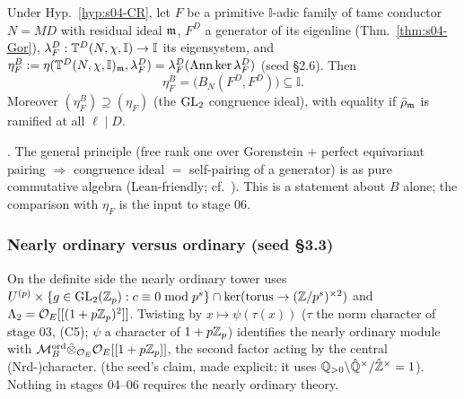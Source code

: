 \begin{theorem}\label{thm:s04-etaB}
Under Hyp.~\ref{hyp:s04-CR}, let $F$ be a primitive $\mathbb I$-adic family of tame conductor $N=MD$ with residual ideal $\mathfrak{m}$, $F^D$ a
generator of its eigenline (Thm.~\ref{thm:s04-Gor}), $\lambda^D_F:\mathbb{T}^D(N,\chi,\mathbb I)\to\mathbb I$ its eigensystem, and
$\eta^B_F:=\eta(\mathbb{T}^D(N,\chi,\mathbb I)_{\mathfrak{m}},\lambda^D_F)=\lambda^D_F(\operatorname{Ann}\ker\lambda^D_F)$ (seed \S2.6). Then
\[\eta^B_F=\big(B_N(F^D,F^D)\big)\subseteq\mathbb I .\]
Moreover $(\eta^B_F)\supseteq(\eta_F)$ (the $\mathrm{GL}_2$ congruence ideal), with equality if $\bar\rho_{\mathfrak{m}}$ is ramified at all $\ell\mid D$.
\end{theorem}
\noindent\stcited{} . The general principle (free rank one over Gorenstein
+ perfect equivariant pairing $\Rightarrow$ congruence ideal $=$ self-pairing of a generator) is \sttoprove{} as pure commutative
algebra (Lean-friendly; cf.\ ). This is a statement about $B$
alone; the comparison with $\eta_F$ is the input to stage 06.

\subsubsection{Nearly ordinary versus ordinary (seed \S3.3)}
\begin{remark}\label{rem:s04-nearly}
On the definite side the nearly ordinary tower uses $U^{(p)}\times\{g\in\mathrm{GL}_2(\mathbb{Z}_p):c\equiv0\bmod p^s\}\cap\ker(\text{torus}\to(\mathbb{Z}/p^s)^{\times2})$
and $\Lambda_2=\mathcal{O}_E[[(1+p\mathbb{Z}_p)^2]]$. Twisting by $x\mapsto\psi(\tau(x))$ ($\tau$ the norm character of stage 03, (C5); $\psi$ a character of
$1+p\mathbb{Z}_p$) identifies the nearly ordinary module with $\mathcal{M}^{\mathrm{ord}}_B\hat\otimes_{\mathcal{O}_E}\mathcal{O}_E[[1+p\mathbb{Z}_p]]$, the second factor acting by the central
(Nrd-)character. \stsketch{} (the seed's claim, made explicit; it uses $\mathbb{Q}_{>0}\backslash\hat{\mathbb{Q}}^\times/\hat{\mathbb{Z}}^\times=1$). Nothing in
stages 04--06 requires the nearly ordinary theory.
\end{remark}

